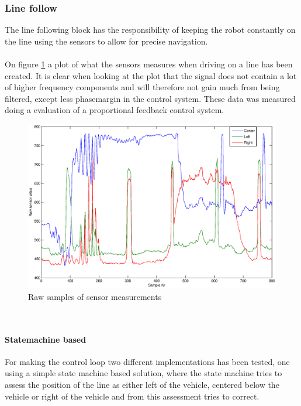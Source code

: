 \documentclass[draft, english, a4paper]{article}
\begin{document}
		\subsubsection{Line follow} %
		    The line following block has the responsibility of keeping the robot
		    constantly on the line using the sensors to allow for precise navigation.\\
		    \\
		    On figure \ref{fig:sensor_measurements} a plot of what the sensors
		    measures when driving on a line has been created. It is clear when
		    looking at the plot that the signal does not contain a lot of higher
		    frequency components and will therefore not gain much from being filtered,
		    except less phasemargin in the control system. These data was measured
		    doing a evaluation of a proportional feedback control system.
		    \\
		    \begin{figure}[htp]
                \centering
    	        \includegraphics[scale=0.45]{sensor_measurements}
	            \caption{Raw samples of sensor measurements}\label{fig:sensor_measurements}
            \end{figure}
            \\
            \paragraph{Statemachine based}
            For making the control loop two different implementations has been
            tested, one using a simple state machine based solution, where the
            state machine tries to assess the position of the line as either left of the
            vehicle, centered below the vehicle or right of the vehicle and from
            this assessment tries to correct.\\
            \\
\end{document}
